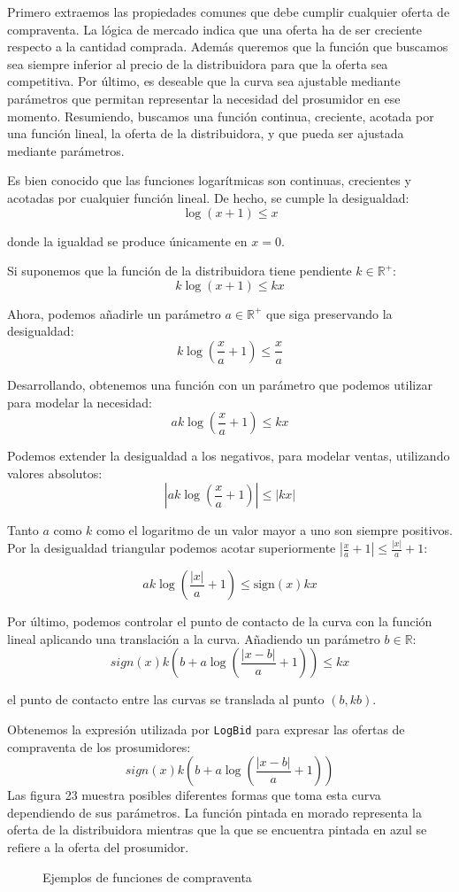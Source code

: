 \documentclass[12pt,a4paper,openright,oneside]{article}
\newcommand{\R}{\mathbb{R}}
\newcommand{\dualImage}[6]
{
	\begin{figure}[htbp]
	\centering
		\subfigure[#2]{\texttt{[image: \#1]}}
		\subfigure[#4]{\texttt{[image: \#3]}}
	\caption{#5}
	\end{figure}
}
\newcommand\abs[1]{\left|#1\right|}
\numberwithin{equation}{section}
\theoremstyle{definition}
\begin{document}
Primero extraemos las propiedades comunes que debe cumplir cualquier oferta de compraventa. La lógica de mercado indica que una oferta ha de ser creciente respecto a la cantidad comprada. Además queremos que la función que buscamos sea siempre inferior al precio de la distribuidora para que la oferta sea competitiva. Por último, es deseable que la curva sea ajustable mediante parámetros que permitan representar la necesidad del prosumidor en ese momento.
Resumiendo, buscamos una función continua, creciente, acotada por una función lineal, la oferta de la distribuidora, y que pueda ser ajustada mediante parámetros.

Es bien conocido que las funciones logarítmicas son continuas, crecientes y acotadas por cualquier función lineal. De hecho, se cumple la desigualdad: 
$$\log(x+1) \leq x$$

donde la igualdad se produce únicamente en $x=0$. 

Si suponemos que la función de la distribuidora tiene pendiente $k \in \R^+$: $$k\log(x+1) \leq kx$$

Ahora, podemos añadirle un parámetro $a \in \R^+$ que siga preservando la desigualdad: $$k\log(\frac{x}{a}+1) \leq \frac{x}{a}$$

Desarrollando, obtenemos una función con un parámetro que podemos utilizar para modelar la necesidad:
$$ak\log(\frac{x}{a}+1) \leq kx$$

Podemos extender la desigualdad a los negativos, para modelar ventas, utilizando valores absolutos:
$$\abs{ak\log(\frac{x}{a}+1)} \leq \abs{kx}$$

Tanto $a$ como $k$ como el logaritmo de un valor mayor a uno son siempre positivos. Por la desigualdad triangular podemos acotar superiormente $\abs{\frac{x}{a}+1} \leq \frac{\abs{x}}{a}+1$:

$$ak\log(\frac{\abs{x}}{a}+1) \leq \text{sign}(x)kx$$

Por último, podemos controlar el punto de contacto de la curva con la función lineal aplicando una translación a la curva. Añadiendo un parámetro $b \in \R$:
$$sign(x)k(b + a\log(\frac{\abs{x - b}}{a}+1)) \leq kx$$

el punto de contacto entre las curvas se translada al punto $(b,kb)$.

Obtenemos la expresión utilizada por \texttt{LogBid} para expresar las ofertas de compraventa de los prosumidores: 
$$sign(x)k(b + a\log(\frac{\abs{x - b}}{a}+1))$$
Las figura 23 muestra posibles diferentes formas que toma esta curva dependiendo de sus parámetros. La función pintada en morado representa la oferta de la distribuidora mientras que la que se encuentra pintada en azul se refiere a la oferta del prosumidor.
\dualImage{plot1.png}{El prosumidor puede comprar y vender energía: k=9, a=1, b=0}{plot2.png}{El prosumidor únicamente compra energía: k=10, a=8, b=5}{Ejemplos de funciones de compraventa}{70}
\end{document}
